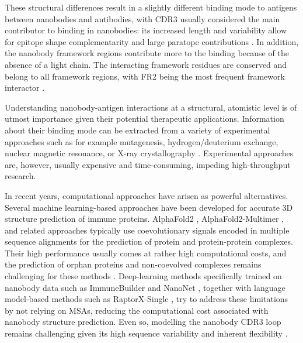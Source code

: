 \documentclass[12pt]{article}
\begin{document}
These structural differences result in a slightly different binding mode to antigens between nanobodies and antibodies, with CDR3 usually considered the main contributor to binding in nanobodies: its increased length and variability allow for epitope shape complementarity and large paratope contributions \cite{gordon2023comparison, zavrtanik2018structural}. In addition, the nanobody framework regions contribute more to the binding because of the absence of a light chain. The interacting framework residues are conserved and belong to all framework regions, with FR2 being the most frequent framework interactor \cite{gordon2023comparison, zavrtanik2018structural, mitchell2018comparative}.

Understanding nanobody-antigen interactions at a structural, atomistic level is of utmost importance given their potential therapeutic applications. Information about their binding mode can be extracted from a variety of experimental approaches such as for example mutagenesis, hydrogen/deuterium exchange, nuclear magnetic resonance, or X-ray crystallography \cite{zhang2017structural, arce2024conformational, fernandez2022nanobody, tamburini2024characterization}. Experimental approaches are, however, usually expensive and time-consuming, impeding high-throughput research.

In recent years, computational approaches have arisen as powerful alternatives. Several machine learning-based approaches have been developed for accurate 3D structure prediction of immune proteins. AlphaFold2 \cite{jumper2021highly}, AlphaFold2-Multimer \cite{evans2021protein}, and related approaches \cite{ahdritz2024openfold, wohlwend2024boltz} typically use coevolutionary signals encoded in multiple sequence alignments for the prediction of protein and protein-protein complexes. Their high performance usually comes at rather high computational costs, and the prediction of orphan proteins and non-coevolved complexes remains challenging for these methods \cite{yin2022benchmarking}. Deep-learning methods specifically trained on nanobody data such as ImmuneBuilder \cite{abanades2023immunebuilder} and NanoNet \cite{cohen2022nanonet}, together with language model-based methods such as RaptorX-Single \cite{jing2024single}, try to address these limitations by not relying on MSAs, reducing the computational cost associated with nanobody structure prediction. Even so, modelling the nanobody CDR3 loop remains challenging given its high sequence variability and inherent flexibility \cite{gordon2023comparison, sircar2011analysis}.
\end{document}
